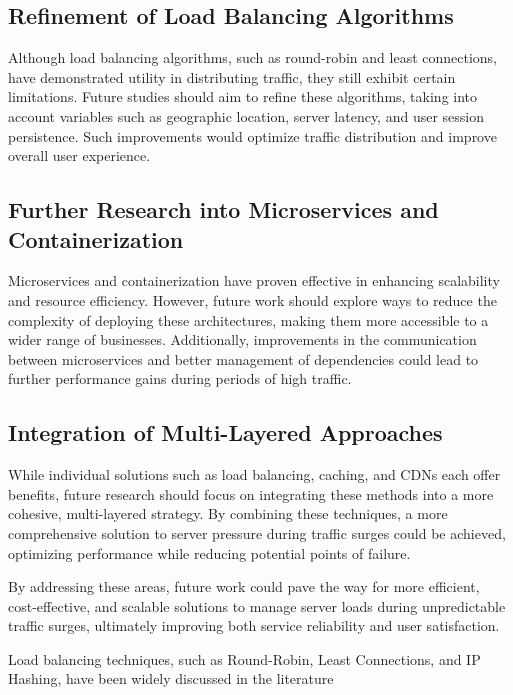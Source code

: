 \documentclass{article}
\begin{document}
\subsection{Refinement of Load Balancing Algorithms}
Although load balancing algorithms, such as round-robin and least connections, have demonstrated utility in distributing traffic, they still exhibit certain limitations. Future studies should aim to refine these algorithms, taking into account variables such as geographic location, server latency, and user session persistence. Such improvements would optimize traffic distribution and improve overall user experience.

\subsection{Further Research into Microservices and Containerization}
Microservices and containerization have proven effective in enhancing scalability and resource efficiency. However, future work should explore ways to reduce the complexity of deploying these architectures, making them more accessible to a wider range of businesses. Additionally, improvements in the communication between microservices and better management of dependencies could lead to further performance gains during periods of high traffic.

\subsection{Integration of Multi-Layered Approaches}
While individual solutions such as load balancing, caching, and CDNs each offer benefits, future research should focus on integrating these methods into a more cohesive, multi-layered strategy. By combining these techniques, a more comprehensive solution to server pressure during traffic surges could be achieved, optimizing performance while reducing potential points of failure.


By addressing these areas, future work could pave the way for more efficient, cost-effective, and scalable solutions to manage server loads during unpredictable traffic surges, ultimately improving both service reliability and user satisfaction.



\cite{Alzoubi2021}
\cite{lorido2014}
\cite{sanchez2011}
\cite{robinson2017}
\cite{prusty2018}
Load balancing techniques, such as Round-Robin, Least Connections, and IP Hashing, have been widely discussed in the literature \cite{Sethi2016, Alakeel2010}
\end{document}
